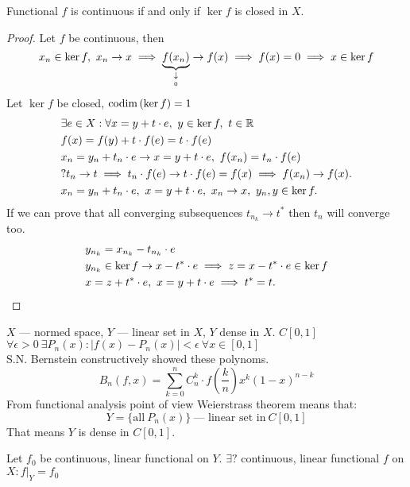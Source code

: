 \begin{thm}
  Functional $f$ is continuous if and only if $\ker{f}$ is closed in $X$.
\end{thm}

\begin{proof}
  Let $f$ be continuous, then 
  \[
    x_n \in \ker{f},\ x_n \to x \implies
    \underbrace{f(x_n)}_{\underset{0}{\downarrow}} \to f(x) \implies f(x) = 0 \implies x \in \ker{f}
  \]
  Let $\ker{f}$ be closed, $\operatorname{codim}{(\ker{f})} = 1$
  \begin{align*}
    &\exists e \in X : \forall x = y + t \cdot e,\ y \in \ker{f},\ t \in \mathbb{R} \\
    &f(x) = f(y) + t \cdot f(e) = t \cdot f(e) \\
    &x_n = y_n + t_n \cdot e \to x = y + t \cdot e,\ f(x_n) = t_n \cdot f(e)\\
    &?t_n \to t \implies t_n \cdot f(e) \to t \cdot f(e) = f(x) \implies f(x_n) \to
      f(x). \\
    &x_n = y_n + t_n \cdot e,\ x = y + t \cdot e,\ x_n \to x,\ y_n,y \in \ker{f}.
  \end{align*}
  If we can prove that all converging subsequences $t_{n_k} \to t^*$ then $t_n$ will
  converge too. 
  \begin{align*}
    &y_{n_k} = x_{n_k} - t_{n_k} \cdot e \\
    &y_{n_k} \in \ker{f} \to x - t^* \cdot e \implies z = x - t^*
      \cdot e \in \ker{f} \\
    &x = z + t^* \cdot e,\ x = y + t \cdot e \implies t^* = t. \qedhere
  \end{align*}
\end{proof}

\noindent
$X$ --- normed space, $Y$ --- linear set in $X$, $Y$ dense in $X$.
$C[0, 1]$ \\
$\forall \epsilon > 0\ \exists P_n(x) : |f(x) - P_n(x)| < \epsilon\ \forall x \in [0, 1]$\\ 
S.N. Bernstein constructively showed these polynoms.
\[
  B_n(f, x) = \sum\limits_{k = 0}^n C_n^k \cdot f\left(\frac{k}{n}\right) x^k (1 - x)^{n - k}
\]
From functional analysis point of view Weierstrass theorem means that:
\[
  Y = \{\text{all}\ P_n(x)\}\ \text{--- linear set in}\ C[0, 1]
\]
That means $Y$ is dense in $C[0, 1]$.

\begin{note}
  Let $f_0$ be continuous, linear functional on $Y$. $\exists ?$ continuous,
  linear functional $f$ on $X : f|_Y = f_0$
\end{note}

